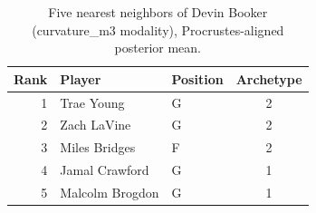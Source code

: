 \begin{table}[htbp]
  \centering\small
  \begin{tabular}{rllc}
    \toprule
    Rank & Player & Position & Archetype \\
    \midrule
    1 & Trae Young & G & 2 \\
    2 & Zach LaVine & G & 2 \\
    3 & Miles Bridges & F & 2 \\
    4 & Jamal Crawford & G & 1 \\
    5 & Malcolm Brogdon & G & 1 \\
    \bottomrule
  \end{tabular}
  \caption{Five nearest neighbors of Devin Booker (curvature_m3 modality), Procrustes-aligned posterior mean.}
  \label{tab:Devin_Booker_neighbors_curvature_m3}
\end{table}

